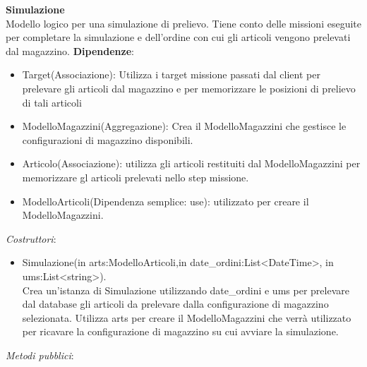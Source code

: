 \textbf{Simulazione}\\
Modello logico per una simulazione di prelievo. Tiene conto delle missioni eseguite per completare la simulazione e dell'ordine con cui gli articoli vengono prelevati dal magazzino.
\textbf{Dipendenze}:
\begin{itemize}
    \item Target(Associazione): Utilizza i target missione passati dal client per prelevare gli articoli dal magazzino e per memorizzare le posizioni di prelievo di tali articoli\\
    \item ModelloMagazzini(Aggregazione): Crea il ModelloMagazzini che gestisce le configurazioni di magazzino disponibili.\\
    \item Articolo(Associazione): utilizza gli articoli restituiti dal ModelloMagazzini per memorizzare gl articoli prelevati nello step missione.\\
    \item ModelloArticoli(Dipendenza semplice: use): utilizzato per creare il ModelloMagazzini.
    \end{itemize}
\textit{Costruttori}:\\
\begin{itemize}
    \item Simulazione(in arts:ModelloArticoli,in date\_ordini:List<DateTime>, in ums:List<string>).\\
    Crea un'istanza di Simulazione utilizzando date\_ordini e ums per prelevare dal database gli articoli da prelevare dalla configurazione di magazzino selezionata.
    Utilizza arts per creare il ModelloMagazzini che verrà utilizzato per ricavare la configurazione di magazzino su cui avviare la simulazione.
\end{itemize}
\textit{Metodi pubblici}:\\
